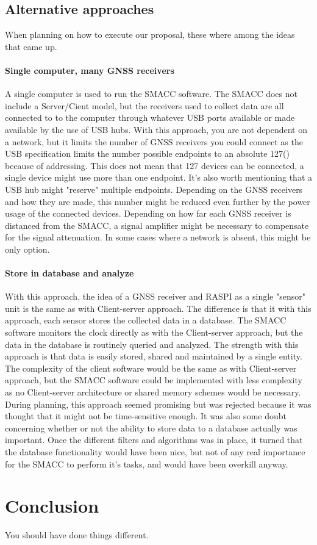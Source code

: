 \documentclass[12pt,english,a4paper]{report}
\begin{document}
\section{Alternative approaches}\label{da}
When planning on how to execute our proposal, these where among the ideas that came up. 

\subsubsection{Single computer, many GNSS receivers}\label{scmgr}
A single computer is used to run the SMACC software. The SMACC does not include a Server/Cient model, but the receivers used to collect data are all connected to to the computer through whatever USB ports available or made available by the use of USB hubs. With this approach, you are not dependent on a network, but it limits the number of GNSS receivers you could connect as the USB specification limits the number possible endpoints to an absolute 127(\cite[pp. 3]{USBTC}) because of addressing. This does not mean that 127 devices can be connected, a single device might use more than one endpoint. It's also worth mentioning that a USB hub might "reserve" multiple endpoints. Depending on the GNSS receivers and how they are made, this number might be reduced even further by the power usage of the connected devices. Depending on how far each GNSS receiver is distanced from the SMACC, a signal amplifier might be necessary to compensate for the signal attenuation. In some cases where a network is absent, this might be only option.

\subsubsection{Store in database and analyze}
With this approach, the idea of a GNSS receiver and RASPI as a single "sensor" unit is the same as with Client-server approach. The difference is that it with this approach, each sensor stores the collected data in a database. The SMACC software monitors the clock directly as with the Client-server approach, but the data in the database is routinely queried and analyzed. The strength with this approach is that data is easily stored, shared and maintained by a single entity. The complexity of the client software would be the same as with Client-server approach, but the SMACC software could be implemented with less complexity as no Client-server architecture or shared memory schemes would be necessary. During planning, this approach seemed promising but was rejected because it was thought that it might not be time-sensitive enough. It was also some doubt concerning whether or not the ability to store data to a database actually was important. Once the different filters and algorithms was in place, it turned that the database functionality would have been nice, but not of any real importance for the SMACC to perform it's tasks, and would have been overkill anyway.

\chapter{Conclusion}
You should have done things different.




\newpage
\printbibliography[title={Complete Bibliography},heading=bibintoc]
\end{document}
